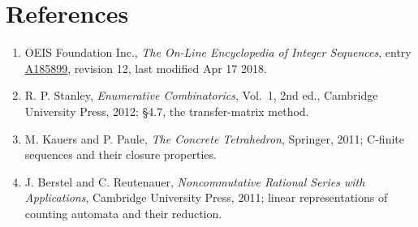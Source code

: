\documentclass[11pt]{article}
\theoremstyle{definition}
\begin{document}
\section{References}

\begin{enumerate}

\item OEIS Foundation Inc., \emph{The On-Line Encyclopedia of Integer Sequences}, entry \href{https://oeis.org/A185899}{A185899}, revision 12, last modified Apr 17 2018.

\item R. P. Stanley, \emph{Enumerative Combinatorics}, Vol.~1, 2nd ed., Cambridge University Press, 2012; \S4.7, the transfer-matrix method.

\item M. Kauers and P. Paule, \emph{The Concrete Tetrahedron}, Springer, 2011; C-finite sequences and their closure properties.

\item J. Berstel and C. Reutenauer, \emph{Noncommutative Rational Series with Applications}, Cambridge University Press, 2011; linear representations of counting automata and their reduction.

\end{enumerate}
\end{document}
